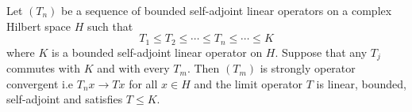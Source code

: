 \begin{theorem}\label{9.3-3}
    Let \( ({T}_{n}) \) be a sequence of bounded self-adjoint linear operators on a complex Hilbert space \( H \) such that  \[  {T}_{1} \leq {T}_{2} \leq \cdots \leq {T}_{n} \leq \cdots \leq K \tag{*}  \]
   where \( K   \) is a bounded self-adjoint linear operator on \( H  \). Suppose that any \( {T}_{j} \) commutes with \( K  \) and with every \( {T}_{m} \). Then \( ({T}_{m}) \) is strongly operator convergent i.e \( {T}_{n}x \to Tx \) for all \( x \in H \) and the limit operator \( T  \) is linear, bounded, self-adjoint and satisfies \( T \leq K  \).
\end{theorem}



